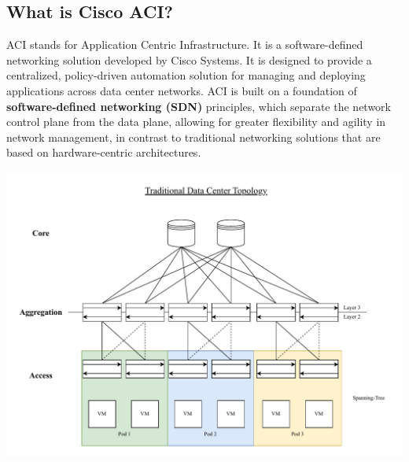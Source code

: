 \subsection{What is Cisco ACI?}
ACI stands for Application Centric Infrastructure. It is a software-defined networking solution developed by Cisco Systems. It is designed to provide a centralized, policy-driven automation solution for managing and deploying applications across data center networks. ACI is built on a foundation of \textbf{software-defined networking (SDN)} principles, which separate the network control plane from the data plane, allowing for greater flexibility and agility in network management, in contrast to traditional networking solutions that are based on hardware-centric architectures.

\begin{center}
    \includegraphics[scale=0.6]{Pics/traditional_topology.pdf}
\end{center}

